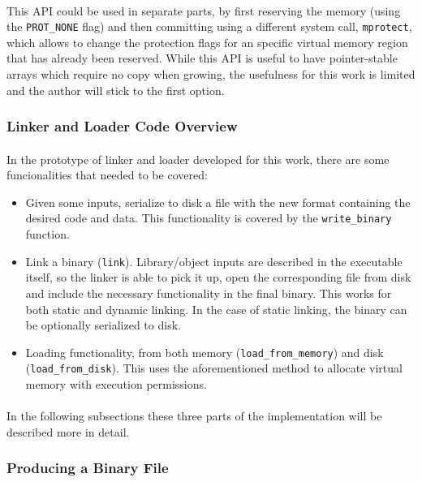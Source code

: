 \documentclass[12pt]{article}
\begin{document}
	\paragraph{}This \acrshort{API} could be used in separate parts, by first reserving the memory (using the \verb|PROT_NONE| flag) and then committing using a different system call, \verb|mprotect|, which allows to change the protection flags for an specific virtual memory region that has already been reserved. While this \acrshort{API} is useful to have pointer-stable arrays which require no copy when growing, the usefulness for this work 
	is limited and the author will stick to the first option.
	
	\subsubsection{Linker and Loader Code Overview}
	
	\paragraph{}In the prototype of linker and loader developed for this work, there are some funcionalities that needed to be covered:
	\begin{itemize}
		\item Given some inputs, serialize to disk a file with the new format containing the desired code and data. This functionality is covered by the \verb|write_binary| function.
		\item Link a binary (\verb|link|). Library/object inputs are described in the executable itself, so the linker is able to pick it up, open the corresponding file from disk and include the necessary functionality in the final binary. This works for both static and dynamic linking. In the case of static linking, the binary can be optionally serialized to disk.
		\item Loading functionality, from both memory (\verb|load_from_memory|) and disk (\verb|load_from_disk|). This uses the aforementioned method to allocate virtual memory with execution permissions.

	\end{itemize}
	\paragraph{}In the following subsections these three parts of the implementation will be described more in detail.
	
	\subsubsection{Producing a Binary File}
\end{document}
